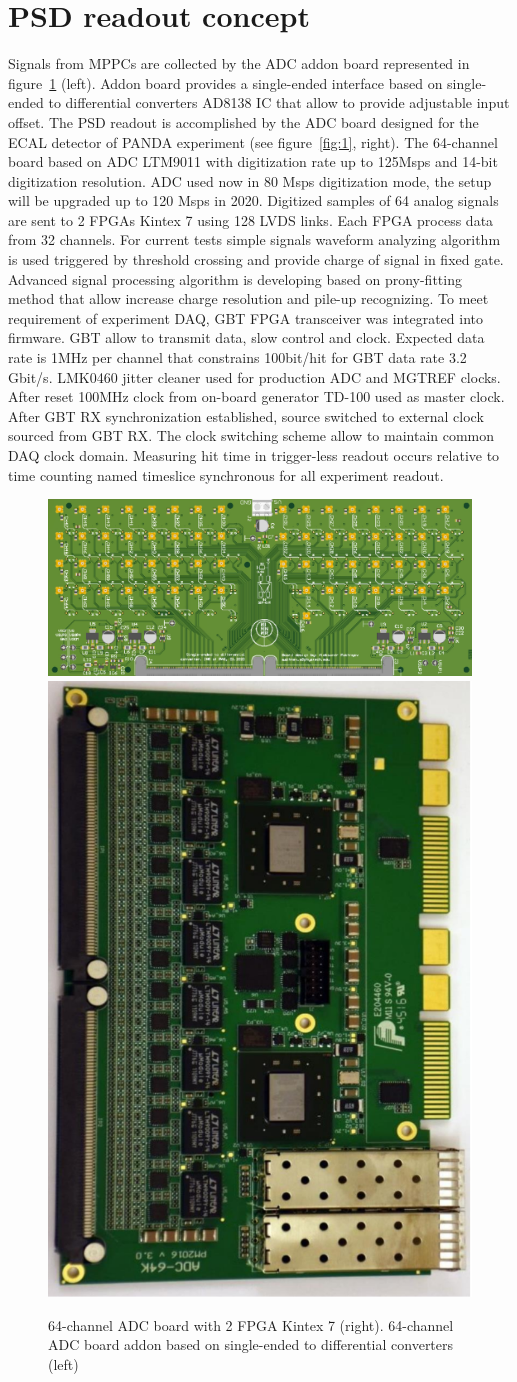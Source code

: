 \documentclass[a4paper,11pt]{article}
\begin{document}
\section{PSD readout concept}
Signals from MPPCs are collected by the ADC addon board represented in figure~\ref{fig:2} (left). Addon board provides a single-ended interface based on single-ended to differential converters AD8138 IC that allow to provide adjustable input offset. The PSD readout is accomplished by the ADC board designed for the ECAL detector of PANDA experiment \cite{1} (see figure~\ref{fig:1}, right). The 64-channel board based on ADC LTM9011 with digitization rate up to 125Msps and 14-bit digitization resolution. ADC used now in 80 Msps digitization mode, the setup will be upgraded up to 120 Msps in 2020. 
Digitized samples of 64 analog signals are sent to 2 FPGAs Kintex 7 using 128 LVDS links. Each FPGA process data from 32 channels. For current tests simple signals waveform analyzing algorithm is used triggered by threshold crossing and provide charge of signal in fixed gate. Advanced signal processing algorithm is developing based on prony-fitting method that allow increase charge resolution and pile-up recognizing. 
To meet requirement of experiment DAQ, GBT FPGA transceiver was integrated into firmware. GBT allow to transmit data, slow control and clock. Expected data rate is 1MHz per channel that constrains 100bit/hit for GBT data rate 3.2 Gbit/s. 
LMK0460 jitter cleaner used for production ADC and MGTREF clocks. After reset 100MHz clock from on-board generator TD-100 used as master clock. After GBT RX synchronization established, source switched to external clock sourced from GBT RX. The clock switching scheme allow to maintain common DAQ clock domain. Measuring hit time in trigger-less readout occurs relative to time counting named timeslice synchronous for all experiment readout.

\begin{figure}[htbp]
\centering %
\includegraphics[width=.5\textwidth]{ADC_addon.png}
\qquad
\includegraphics[width=.2\textwidth]{ADC_board.png}

\caption{\label{fig:2} 64-channel ADC board with 2 FPGA Kintex 7 (right). 64-channel ADC board addon  based on single-ended to differential converters (left) }
\end{figure}
\end{document}
